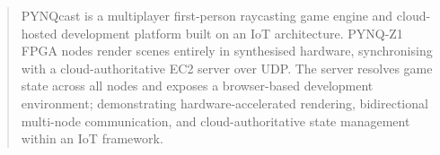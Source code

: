 


\begin{abstract}

PYNQcast is a multiplayer first-person raycasting game engine and 
cloud-hosted development platform built on an IoT architecture. 
PYNQ-Z1 FPGA nodes render scenes entirely in synthesised hardware, 
synchronising with a cloud-authoritative EC2 server over UDP. The 
server resolves game state across all nodes and exposes a 
browser-based development environment; demonstrating hardware-accelerated rendering, 
bidirectional multi-node communication, and cloud-authoritative state 
management within an IoT framework.


\end{abstract}


